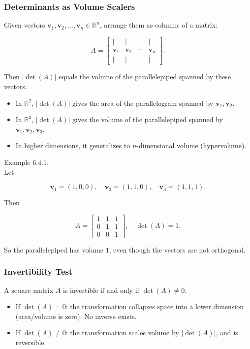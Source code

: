 \documentclass[
  12pt,
  a4paper,
]{article}
\begin{document}
\subsubsection{Determinants as Volume
Scalers}\label{determinants-as-volume-scalers}

Given vectors
\(\mathbf{v}_1, \mathbf{v}_2, \dots, \mathbf{v}_n \in \mathbb{R}^n\),
arrange them as columns of a matrix:

\[A = \begin{bmatrix}
| & | &  & | \\
\mathbf{v}_1 & \mathbf{v}_2 & \cdots & \mathbf{v}_n \\
| & | &  & |
\end{bmatrix}.\]

Then \(|\det(A)|\) equals the volume of the parallelepiped spanned by
these vectors.

\begin{itemize}
\item
  In \(\mathbb{R}^2\), \(|\det(A)|\) gives the area of the parallelogram
  spanned by \(\mathbf{v}_1, \mathbf{v}_2\).
\item
  In \(\mathbb{R}^3\), \(|\det(A)|\) gives the volume of the
  parallelepiped spanned by
  \(\mathbf{v}_1, \mathbf{v}_2, \mathbf{v}_3\).
\item
  In higher dimensions, it generalizes to \(n\)-dimensional volume
  (hypervolume).
\end{itemize}

Example 6.4.1.\\
Let

\[\mathbf{v}_1 = (1,0,0), \quad \mathbf{v}_2 = (1,1,0), \quad \mathbf{v}_3 = (1,1,1).\]

Then

\[A = \begin{bmatrix}
1 & 1 & 1 \\
0 & 1 & 1 \\
0 & 0 & 1
\end{bmatrix}, \quad \det(A) = 1.\]

So the parallelepiped has volume \(1\), even though the vectors are not
orthogonal.

\subsubsection{Invertibility Test}\label{invertibility-test}

A square matrix \(A\) is invertible if and only if \(\det(A) \neq 0\).

\begin{itemize}
\item
  If \(\det(A) = 0\): the transformation collapses space into a lower
  dimension (area/volume is zero). No inverse exists.
\item
  If \(\det(A) \neq 0\): the transformation scales volume by
  \(|\det(A)|\), and is reversible.
\end{itemize}
\end{document}
